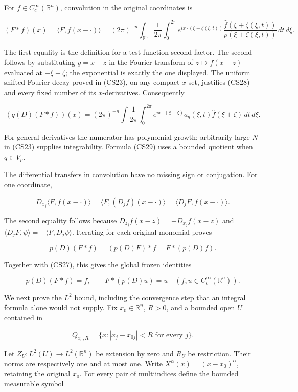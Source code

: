 \documentclass[
  11pt,
]{article}
\begin{document}
For \(f\in C_c^\infty(\mathbb R^n)\), convolution in the original
coordinates is

\[
 (F*f)(x)=\langle F, f(x-\cdot)\rangle
 =(2\pi)^{-n}\int_{\mathbb R^n}\frac1{2\pi}\int_0^{2\pi}
     e^{ix\cdot(\xi+\zeta(\xi,t))}
     \frac{\widehat f(\xi+\zeta(\xi,t))}
          {p(\xi+\zeta(\xi,t))}\,dt\,d\xi.                    \tag{CS28}
\]

The first equality is the definition for a test-function second factor.
The second follows by substituting \(y=x-z\) in the Fourier transform of
\(z\mapsto f(x-z)\) evaluated at \(-\xi-\zeta\); the exponential is
exactly the one displayed. The uniform shifted Fourier decay proved in
(CS23), on any compact \(x\) set, justifies (CS28) and every fixed
number of its \(x\)-derivatives. Consequently

\[
 (q(D)(F*f))(x)
 =(2\pi)^{-n}\int\frac1{2\pi}\int_0^{2\pi}
     e^{ix\cdot(\xi+\zeta)}a_q(\xi,t)\widehat f(\xi+\zeta)
                                                \,dt\,d\xi.   \tag{CS29}
\]

For general derivatives the numerator has polynomial growth; arbitrarily
large \(N\) in (CS23) supplies integrability. Formula (CS29) uses a
bounded quotient when \(q\in V_p\).

The differential transfers in convolution have no missing sign or
conjugation. For one coordinate,

\[
 D_{x_j}\langle F,f(x-\cdot)\rangle
  =\langle F,(D_jf)(x-\cdot)\rangle
  =\langle D_jF,f(x-\cdot)\rangle.
\]

The second equality follows because \(D_{z_j}f(x-z)=-D_{x_j}f(x-z)\) and
\(\langle D_jF,\psi\rangle=-\langle F,D_j\psi\rangle\). Iterating for
each original monomial proves

\[
 p(D)(F*f)=(p(D)F)*f=F*(p(D)f).                               \tag{CS30}
\]

Together with (CS27), this gives the global frozen identities

\[
 p(D)(F*f)=f,\qquad F*(p(D)u)=u
                       \quad(f,u\in C_c^\infty(\mathbb R^n)). \tag{CS31}
\]

We next prove the \(L^2\) bound, including the convergence step that an
integral formula alone would not supply. Fix \(x_0\in\mathbb R^n\),
\(R>0\), and a bounded open \(U\) contained in

\[
 Q_{x_0,R}=\{x:|x_j-x_{0j}|<R\text{ for every }j\}.             \tag{CS32}
\]

Let \(Z_U:L^2(U)\to L^2(\mathbb R^n)\) be extension by zero and \(R_U\)
be restriction. Their norms are respectively one and at most one. Write
\(X^\alpha(x)=(x-x_0)^\alpha\), retaining the original \(x_0\). For
every pair of multiindices define the bounded measurable symbol
\end{document}
